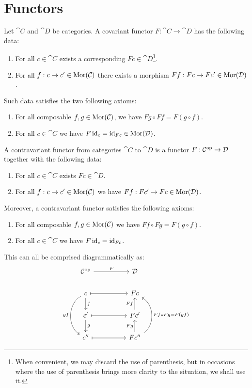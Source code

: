 \section{Functors}

\begin{definition}\label{def: functor}
Let \(\cat C\) and \(\cat D\) be categories. A covariant functor \(F: \cat C \to
\cat D\) has the following data:
\begin{enumerate}[({DF}1)]
\item For all \(c \in \cat C\) exists a corresponding \(F c \in \cat
  D\)\footnote{When convenient, we may discard the use of parenthesis, but in
    occasions where the use of parenthesis brings more clarity to the
    situation, we shall use it.}.
\item For all \(f: c \to c' \in \operatorname{Mor}(\mathcal C)\) there exists a morphism \(F
  f: F c \to F c' \in \operatorname{Mor}(\mathcal D)\).
\end{enumerate}
Such data satisfies the two following axioms:
\begin{enumerate}[({AF}1)]
\item For all composable \(f, g \in \operatorname{Mor}(\mathcal C)\), we have \(F g \circ F f
  = F (g \circ f)\).
\item For all \(c \in \cat C\) we have \(F \operatorname{id}_c = \operatorname{id}_{F c} \in \operatorname{Mor}(\mathcal
  D)\).
\end{enumerate}
\end{definition}

\begin{definition}
\label{def: contravariant functor}
A contravariant functor from categories \(\cat C\) to \(\cat D\) is a functor
\(F: \mathcal C^{\mathrm{op}} \to \mathcal D\) together with the following data:
\begin{enumerate}[({DCF}1)]
\item For all \(c \in \cat C\) exists \(F c \in \cat D\).
\item For all \(f: c \to c' \in \operatorname{Mor}(\mathcal C)\) we have \(F f: F c' \to F c
  \in \operatorname{Mor}(\mathcal D)\).
\end{enumerate}
Moreover, a contravariant functor satisfies the following axioms:
\begin{enumerate}[({ACF}1)]
\item For all composable \(f, g \in \operatorname{Mor}(\mathcal C)\) we have \(F f \circ F g =
  F (g \circ f)\).
\item For all \(c \in \cat C\) we have \(F \operatorname{id}_c = \operatorname{id}_{F c}\).
\end{enumerate}
This can all be comprised diagrammatically as:
\[
  \begin{tikzcd}
    \cat C^\op \ar[rr, "F"] & &\cat D
    \\
    c \ar[d, "f"] \ar[dd, bend right = 60, swap, "g f"]
    \ar[rr, mapsto]
    & &F c
    \\
    c' \ar[d, "g"] \ar[rr, mapsto]
    & &F c' \ar[u, "F f"]
    \\
    c'' \ar[rr, mapsto]
    & & F c''
    \ar[u, "F g"]
    \ar[uu, bend right = 60, swap, "F f \circ F g = F (gf)"]
  \end{tikzcd}
\]
\end{definition}

